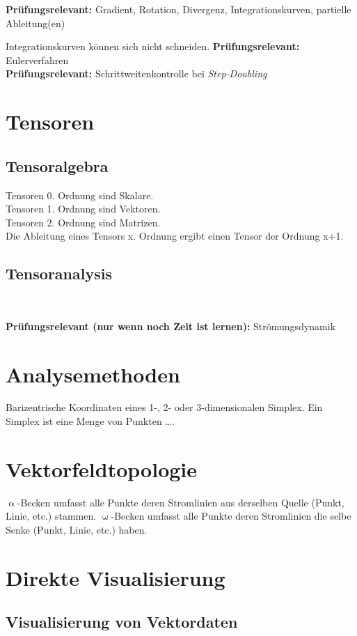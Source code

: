 \documentclass[12pt,a4paper,oneside,normalheadings,abstracton,liststotoc,bibtotoc,titlepage,pdftex]{scrbook}
\begin{document}
\textbf{Prüfungsrelevant:} Gradient, Rotation, Divergenz, Integrationskurven, partielle Ableitung(en)


Integrationskurven können sich nicht schneiden.
\textbf{Prüfungsrelevant:} Eulerverfahren\\
\textbf{Prüfungsrelevant:} Schrittweitenkontrolle bei \textit{Step-Doubling}\\



\section{Tensoren}
\subsection{Tensoralgebra}
Tensoren 0. Ordnung sind Skalare.\\
Tensoren 1. Ordnung sind Vektoren.\\
Tensoren 2. Ordnung sind Matrizen.\\
Die Ableitung eines Tensors x. Ordnung ergibt einen Tensor der Ordnung x+1. 
\subsection{Tensoranalysis}

\


\textbf{Prüfungsrelevant (nur wenn noch Zeit ist lernen):} Strömungsdynamik\\

\section{Analysemethoden}
Barizentrische Koordinaten eines 1-, 2- oder 3-dimensionalen Simplex. Ein Simplex ist eine Menge von Punkten \dots . 

\section{Vektorfeldtopologie}
$\upalpha$-Becken umfasst alle Punkte deren Stromlinien aus derselben Quelle (Punkt, Linie, etc.) stammen. $\upomega$-Becken umfasst alle Punkte deren Stromlinien die selbe Senke (Punkt, Linie, etc.) haben.

\section{Direkte Visualisierung}
\subsection{Visualisierung von Vektordaten}
\end{document}
